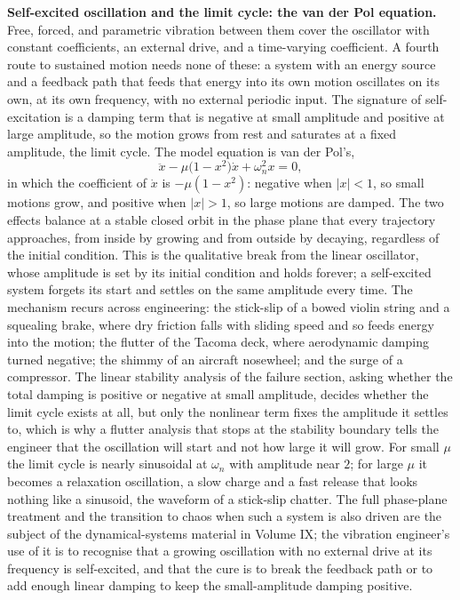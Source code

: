 \begin{mastery}
\textbf{Self-excited oscillation and the limit cycle: the van der Pol
equation.} Free, forced, and parametric vibration between them cover the
oscillator with constant coefficients, an external drive, and a
time-varying coefficient. A fourth route to sustained motion needs none
of these: a system with an energy source and a feedback path that feeds
that energy into its own motion oscillates on its own, at its own
frequency, with no external periodic input. The signature of
self-excitation is a damping term that is negative at small amplitude and
positive at large amplitude, so the motion grows from rest and saturates
at a fixed amplitude, the limit cycle. The model equation is van der
Pol's,
\[
\ddot{x} - \mu\big(1 - x^2\big)\dot{x} + \omega_n^2 x = 0,
\]
in which the coefficient of $\dot{x}$ is $-\mu(1 - x^2)$: negative when
$|x| < 1$, so small motions grow, and positive when $|x| > 1$, so large
motions are damped. The two effects balance at a stable closed orbit in
the phase plane that every trajectory approaches, from inside by growing
and from outside by decaying, regardless of the initial condition. This
is the qualitative break from the linear oscillator, whose amplitude is
set by its initial condition and holds forever; a self-excited system
forgets its start and settles on the same amplitude every time. The
mechanism recurs across engineering: the stick-slip of a bowed violin
string and a squealing brake, where dry friction falls with sliding
speed and so feeds energy into the motion; the flutter of the Tacoma
deck, where aerodynamic damping turned negative; the shimmy of an
aircraft nosewheel; and the surge of a compressor. The linear stability
analysis of the failure section, asking whether the total damping is
positive or negative at small amplitude, decides whether the limit cycle
exists at all, but only the nonlinear term fixes the amplitude it settles
to, which is why a flutter analysis that stops at the stability boundary
tells the engineer that the oscillation will start and not how large it
will grow. For small $\mu$ the limit cycle is nearly sinusoidal at
$\omega_n$ with amplitude near $2$; for large $\mu$ it becomes a
relaxation oscillation, a slow charge and a fast release that looks
nothing like a sinusoid, the waveform of a stick-slip chatter. The full
phase-plane treatment and the transition to chaos when such a system is
also driven are the subject of the dynamical-systems material in
Volume IX; the vibration engineer's use of it is to recognise that a
growing oscillation with no external drive at its frequency is
self-excited, and that the cure is to break the feedback path or to add
enough linear damping to keep the small-amplitude damping positive.
\end{mastery}

